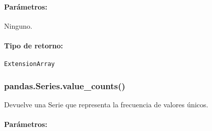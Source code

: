     \paragraph{Parámetros:} Ninguno.

    \paragraph{Tipo de retorno:} \texttt{ExtensionArray}

    \subsubsection{pandas.Series.value\_counts()} Devuelve una Serie que representa la frecuencia de valores únicos.

    \paragraph{Parámetros:}
